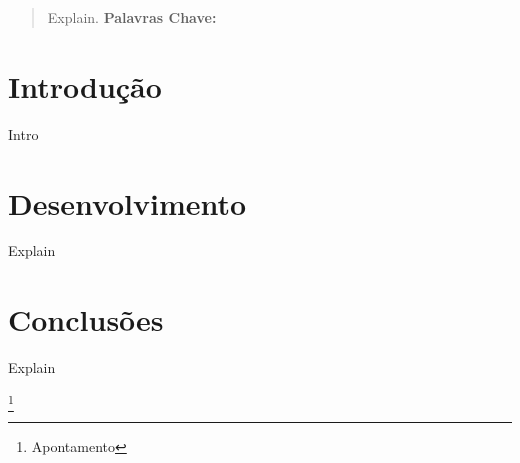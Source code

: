 

\tableofcontents
\appendix
\pagestyle{plain} %
\setlength{\parindent}{0in}
\label{Resumo}
\begin{abstract}
\qquad Explain.
\vfill
\textbf{Palavras Chave:}
\end{abstract}
\newpage
\section{Introdução}
\qquad Intro
\newpage
\section{Desenvolvimento}
\qquad Explain
\newpage
\section{Conclusões}
\qquad Explain
\newpage
\listoffigures
\cite{*}

\newpage
\footnote{Apontamento}

\begin{comment}

\end{comment}
